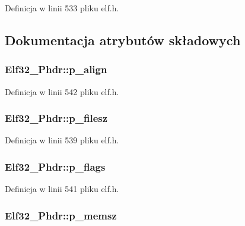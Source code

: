 Definicja w linii 533 pliku elf.\-h.



\subsection{Dokumentacja atrybutów składowych}
\hypertarget{struct_elf32___phdr_afd09d9e4297b13fc94fd57d09f2a9f70}{
\subsubsection[{p\-\_\-align}]{ Elf32\-\_\-\-Phdr\-::p\-\_\-align}}\label{struct_elf32___phdr_afd09d9e4297b13fc94fd57d09f2a9f70}


Definicja w linii 542 pliku elf.\-h.

\hypertarget{struct_elf32___phdr_ac9151f2e11001284bf1c7d2d2659555c}{
\subsubsection[{p\-\_\-filesz}]{ Elf32\-\_\-\-Phdr\-::p\-\_\-filesz}}\label{struct_elf32___phdr_ac9151f2e11001284bf1c7d2d2659555c}


Definicja w linii 539 pliku elf.\-h.

\hypertarget{struct_elf32___phdr_a35c457e6828894b7b275730593802050}{
\subsubsection[{p\-\_\-flags}]{ Elf32\-\_\-\-Phdr\-::p\-\_\-flags}}\label{struct_elf32___phdr_a35c457e6828894b7b275730593802050}


Definicja w linii 541 pliku elf.\-h.

\hypertarget{struct_elf32___phdr_ada1cdd3d6ccb79a17bed0e3c21379c84}{
\subsubsection[{p\-\_\-memsz}]{ Elf32\-\_\-\-Phdr\-::p\-\_\-memsz}}\label{struct_elf32___phdr_ada1cdd3d6ccb79a17bed0e3c21379c84}


